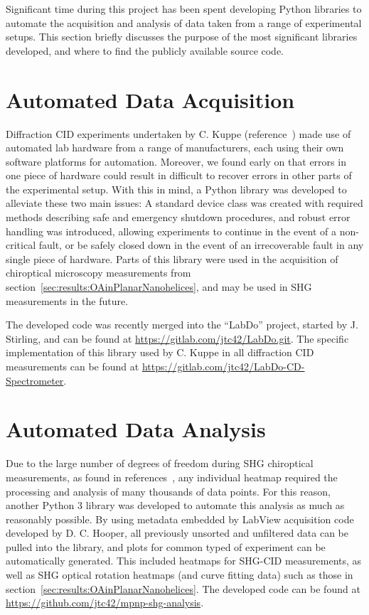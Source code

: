 Significant time during this project has been spent developing Python libraries to automate the acquisition and analysis of data taken from a range of experimental setups. This section briefly discusses the purpose of the most significant libraries developed, and where to find the publicly available source code.

\section{Automated Data Acquisition}\label{sec:appendix:labdo}
Diffraction CID experiments undertaken by C. Kuppe (reference~\cite{Kuppe2018}) made use of automated lab hardware from a range of manufacturers, each using their own software platforms for automation. Moreover, we found early on that errors in one piece of hardware could result in difficult to recover errors in other parts of the experimental setup. With this in mind, a Python library was developed to alleviate these two main issues: A standard device class was created with required methods describing safe and emergency shutdown procedures, and robust error handling was introduced, allowing experiments to continue in the event of a non-critical fault, or be safely closed down in the event of an irrecoverable fault in any single piece of hardware.
Parts of this library were used in the acquisition of chiroptical microscopy measurements from section~\ref{sec:results:OAinPlanarNanohelices}, and may be used in SHG measurements in the future.

The developed code was recently merged into the ``LabDo'' project, started by J. Stirling, and can be found at \url{https://gitlab.com/jtc42/LabDo.git}.
The specific implementation of this library used by C. Kuppe in all diffraction CID measurements can be found at \url{https://gitlab.com/jtc42/LabDo-CD-Spectrometer}.

\section{Automated Data Analysis}\label{sec:appendix:pyshg}
Due to the large number of degrees of freedom during SHG chiroptical measurements, as found in references~\cite{Hooper2017, Collins2018b}, any individual heatmap required the processing and analysis of many thousands of data points. For this reason, another Python 3 library was developed to automate this analysis as much as reasonably possible. By using metadata embedded by LabView acquisition code developed by D. C. Hooper, all previously unsorted and unfiltered data can be pulled into the library, and plots for common typed of experiment can be automatically generated. This included heatmaps for SHG-CID measurements, as well as SHG optical rotation heatmaps (and curve fitting data) such as those in section~\ref{sec:results:OAinPlanarNanohelices}.
The developed code can be found at \url{https://github.com/jtc42/mpnp-shg-analysis}.